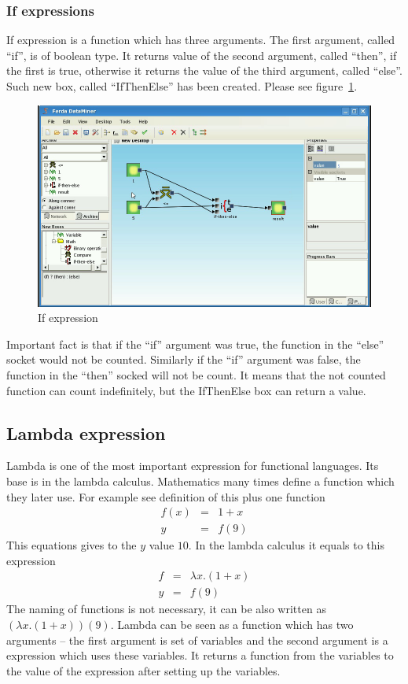 \documentclass[a4paper,12pt]{book}
\begin{document}
\subsubsection{If expressions}
If expression is a function which has three arguments. The first argument, called ``if'', is of boolean type. It returns value of the second argument, called ``then'', if the first is true, otherwise it returns the value of the third argument, called ``else''. Such new box, called ``IfThenElse'' has been created. Please see figure~\ref{fig:boxIfThenElse}.
\begin{figure}
\includegraphics[width=1\textwidth]{ifthenelse2.png}
	\caption{If expression}
	\label{fig:boxIfThenElse}
\end{figure}

Important fact is that if the ``if'' argument was true, the function in the ``else'' socket would not be counted. Similarly if the ``if'' argument was false, the function in the ``then'' socked will not be count. It means that the not counted function can count indefinitely, but the IfThenElse box can return a value.

\subsection{Lambda expression}
Lambda is one of the most important expression for functional languages. Its base is in the lambda calculus. Mathematics many times define a function which they later use. For example see definition of this plus one function
\begin{eqnarray*}
f(x)&=&1 + x\\
y&=&f(9)
\end{eqnarray*}
This equations gives to the $y$ value $10$. In the lambda calculus it equals to this expression
\begin{eqnarray*}
f&=&\lambda x.(1+x)\\
y&=&f(9)
\end{eqnarray*}
The naming of functions is not necessary, it can be also written as $(\lambda x.(1+x))(9)$. Lambda can be seen as a function which has two arguments -- the first argument is set of variables and the second argument is a expression which uses these variables. It returns a function from the variables to the value of the expression after setting up the variables.
\end{document}
